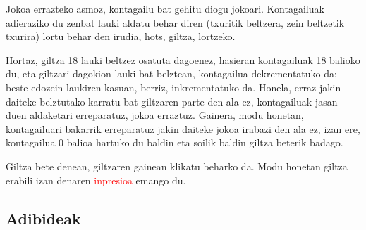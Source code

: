 \documentclass[dvipsnames]{AritzhClass}
\begin{document}
Jokoa errazteko asmoz, kontagailu bat gehitu diogu jokoari. Kontagailuak adieraziko du zenbat lauki aldatu behar diren (txuritik beltzera, zein beltzetik txurira) lortu behar den irudia, hots, giltza, lortzeko.

Hortaz, giltza 18 lauki beltzez osatuta dagoenez, hasieran kontagailuak 18 balioko du, eta giltzari dagokion lauki bat belztean, kontagailua dekrementatuko da; beste edozein laukiren kasuan, berriz, inkrementatuko da. Honela, erraz jakin daiteke belztutako karratu bat giltzaren parte den ala ez, kontagailuak jasan duen aldaketari erreparatuz, jokoa erraztuz. Gainera, modu honetan, kontagailuari bakarrik erreparatuz jakin daiteke jokoa irabazi den ala ez, izan ere, kontagailua 0 balioa hartuko du baldin eta soilik baldin giltza beterik badago.

Giltza bete denean, giltzaren gainean klikatu beharko da. Modu honetan giltza erabili izan denaren \textcolor{red}{inpresioa} emango du. 

\subsection{Adibideak}
\end{document}
